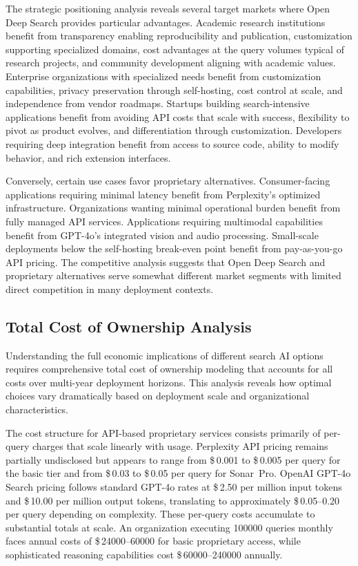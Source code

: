 The strategic positioning analysis reveals several target markets where Open Deep Search provides particular advantages. Academic research institutions benefit from transparency enabling reproducibility and publication, customization supporting specialized domains, cost advantages at the query volumes typical of research projects, and community development aligning with academic values. Enterprise organizations with specialized needs benefit from customization capabilities, privacy preservation through self-hosting, cost control at scale, and independence from vendor roadmaps. Startups building search-intensive applications benefit from avoiding API costs that scale with success, flexibility to pivot as product evolves, and differentiation through customization. Developers requiring deep integration benefit from access to source code, ability to modify behavior, and rich extension interfaces.

Conversely, certain use cases favor proprietary alternatives. Consumer-facing applications requiring minimal latency benefit from Perplexity's optimized infrastructure. Organizations wanting minimal operational burden benefit from fully managed API services. Applications requiring multimodal capabilities benefit from GPT-4o's integrated vision and audio processing. Small-scale deployments below the self-hosting break-even point benefit from pay-as-you-go API pricing. The competitive analysis suggests that Open Deep Search and proprietary alternatives serve somewhat different market segments with limited direct competition in many deployment contexts.

\subsection{Total Cost of Ownership Analysis}

Understanding the full economic implications of different search AI options requires comprehensive total cost of ownership modeling that accounts for all costs over multi-year deployment horizons. This analysis reveals how optimal choices vary dramatically based on deployment scale and organizational characteristics.

The cost structure for API-based proprietary services consists primarily of per-query charges that scale linearly with usage. Perplexity API pricing remains partially undisclosed but appears to range from \$\,\num{0.001} to \$\,\num{0.005} per query for the basic tier and from \$\,\num{0.03} to \$\,\num{0.05} per query for Sonar~Pro. OpenAI GPT-4o Search pricing follows standard GPT-4o rates at \$\,\num{2.50} per million input tokens and \$\,\num{10.00} per million output tokens, translating to approximately \$\,\numrange{0.05}{0.20} per query depending on complexity. These per-query costs accumulate to substantial totals at scale. An organization executing \num{100000} queries monthly faces annual costs of \$\,\numrange{24000}{60000} for basic proprietary access, while sophisticated reasoning capabilities cost \$\,\numrange{60000}{240000} annually.

